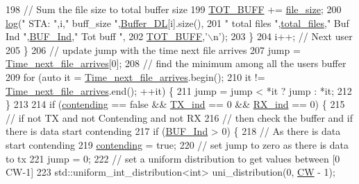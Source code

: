 \begin{DoxyCode}
198             \textcolor{comment}{// Sum the file size to total buffer size}
199             \hyperlink{classAP_a03aea575eb6665fe9498fd30352e1d35}{TOT\_BUFF} += \hyperlink{classAP_a6fe321d9d8cddb40d81e6c7152fae189}{file\_size};
200             \hyperlink{AP_8cpp_aa5af53510557e77a03906c5016ebe66f}{log}(\textcolor{stringliteral}{" STA: "},i,\textcolor{stringliteral}{" buff\_size "},\hyperlink{classAP_af5970c0fdff7405ec2043c7fdd8cb427}{Buffer\_DL}[i].size(),
201         \textcolor{stringliteral}{" total files "},\hyperlink{classAP_aac5ade30eaf4b86c9b32ff7d37974a55}{total\_files},\textcolor{stringliteral}{" Buf Ind "},\hyperlink{classAP_a6a9694207e9646b4a1c95b54725fcd3b}{BUF\_Ind},\textcolor{stringliteral}{" Tot buff "},
202         \hyperlink{classAP_a03aea575eb6665fe9498fd30352e1d35}{TOT\_BUFF},\textcolor{charliteral}{'\(\backslash\)n'});
203         \}
204         i++; \textcolor{comment}{// Next user}
205     \}
206     \textcolor{comment}{// update jump with the time next file arrives      }
207     jump = \hyperlink{classAP_a21b0b1203a2a7701c66b6c5a803b0160}{Time\_next\_file\_arrives}[0];
208     \textcolor{comment}{// find the minimum among all the users buffer}
209     \textcolor{keywordflow}{for} (\textcolor{keyword}{auto} it = \hyperlink{classAP_a21b0b1203a2a7701c66b6c5a803b0160}{Time\_next\_file\_arrives}.begin();
210             it != \hyperlink{classAP_a21b0b1203a2a7701c66b6c5a803b0160}{Time\_next\_file\_arrives}.end(); ++it) \{
211         jump = jump < *it ? jump : *it;
212     \}
213 
214     \textcolor{keywordflow}{if} (\hyperlink{classAP_afe722094c1dea7972332a788411cc488}{contending} == \textcolor{keyword}{false} && \hyperlink{classAP_adce53b419ff50565a7084b8d893c5be1}{TX\_ind} == 0 && \hyperlink{classAP_af5b1c2bc10a9ce9f3007bbf37f95f144}{RX\_ind} == 0) \{
215         \textcolor{comment}{// if not TX and not Contending and not RX}
216         \textcolor{comment}{// then check the buffer and if there is data start contending}
217         \textcolor{keywordflow}{if} (\hyperlink{classAP_a6a9694207e9646b4a1c95b54725fcd3b}{BUF\_Ind} > 0) \{
218             \textcolor{comment}{// As there is data start contending}
219             \hyperlink{classAP_afe722094c1dea7972332a788411cc488}{contending} = \textcolor{keyword}{true};
220             \textcolor{comment}{// set jump to zero as there is data to tx}
221             jump = 0;
222             \textcolor{comment}{// set a uniform distribution to get values between [0 CW-1]}
223             std::uniform\_int\_distribution<int> uni\_distribution(0, \hyperlink{classAP_a5f5fc6fd5279167b196a6387ff49825b}{CW} - 1);

\end{DoxyCode}
